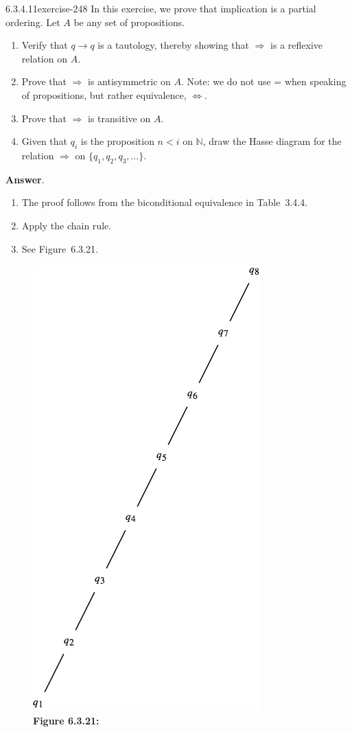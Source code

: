 \documentclass[twoside,10pt,]{book}
\numberwithin{equation}{section}
\begin{document}
\begin{divisionsolution}{6.3.4.11}{}{exercise-248}%
\hypertarget{p-2106}{}%
In this exercise, we prove that implication is a partial ordering. Let \(A\) be any set of propositions.%
\par
\hypertarget{p-2107}{}%
\leavevmode%
\begin{enumerate}[label=(\alph*)]
\item\hypertarget{li-1115}{}\hypertarget{p-2108}{}%
Verify that \(q \to  q\) is a tautology, thereby showing that \(\Rightarrow\) is a reflexive relation on \(A\).%
\item\hypertarget{li-1116}{}Prove that \(\Rightarrow\) is antisymmetric on \(A\). Note: we do not use = when speaking of propositions, but rather equivalence, \(\Leftrightarrow\).%
\item\hypertarget{li-1117}{}\hypertarget{p-2109}{}%
Prove that \(\Rightarrow\) is transitive on \(A\).%
\item\hypertarget{li-1118}{}\hypertarget{p-2110}{}%
Given that \(q_i\) is the proposition \(n < i\) on \(\mathbb{N}\), draw the Hasse diagram for the relation \(\Rightarrow\) on \(\{q_1, q_2, q_3,\ldots \}\).%
\end{enumerate}
%
\par\smallskip%
\noindent\textbf{Answer}.\quad%
\hypertarget{p-2111}{}%
\leavevmode%
\begin{enumerate}[label=(\alph*)]
\item\hypertarget{li-1119}{}\hypertarget{p-2112}{}%
The proof follows from the biconditional equivalence in Table~3.4.4.%
\item\hypertarget{li-1120}{}\hypertarget{p-2113}{}%
Apply the chain rule.%
\item\hypertarget{li-1121}{}\hypertarget{p-2114}{}%
See Figure~6.3.21.%
\end{enumerate}
%
\begin{figure}
\centering
\includegraphics[width=0.4\linewidth]{images/fig-sol-6-3-11.png}
\caption*{\textbf{Figure 6.3.21:} }
\end{figure}
\end{divisionsolution}%
\end{document}
